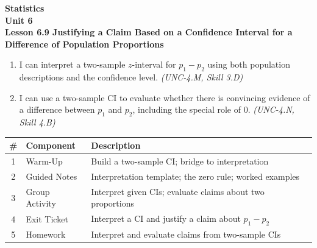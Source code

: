 \documentclass[10pt]{article}
\begin{document}
\vspace{-0.8in}

\begin{center}
  {\color{white}\textbf{\LARGE Statistics}}\\[4pt]
  {\color{skymid}\large\textbf{Unit 6}}\\[6pt]
  {\color{white}\textbf{\large Lesson 6.9 \quad Justifying a Claim Based on a Confidence Interval for a Difference of Population Proportions}}
\end{center}

\vspace{0.22in}
\namedateperiod
\vspace{0.18in}

\begin{learningtargetbox}
\small
\begin{enumerate}[leftmargin=1.5em, itemsep=5pt]
  \item I can interpret a two-sample $z$-interval for $p_1 - p_2$ using both population descriptions and the confidence level. \textit{(UNC-4.M, Skill 3.D)}
  \item I can use a two-sample CI to evaluate whether there is convincing evidence of a difference between $p_1$ and $p_2$, including the special role of 0. \textit{(UNC-4.N, Skill 4.B)}
\end{enumerate}
\end{learningtargetbox}

\vspace{0.14in}

\begin{tocbox}
\small
\renewcommand{\arraystretch}{1.5}
\begin{tabularx}{\linewidth}{@{} c l X @{}}
\rowcolor{sky}
\textbf{\#} & \textbf{Component} & \textbf{Description} \\
\midrule
1 & Warm-Up        & Build a two-sample CI; bridge to interpretation \\
2 & Guided Notes   & Interpretation template; the zero rule; worked examples \\
3 & Group Activity & Interpret given CIs; evaluate claims about two proportions \\
4 & Exit Ticket    & Interpret a CI and justify a claim about $p_1-p_2$ \\
5 & Homework       & Interpret and evaluate claims from two-sample CIs \\
\end{tabularx}
\end{tocbox}
\end{document}
